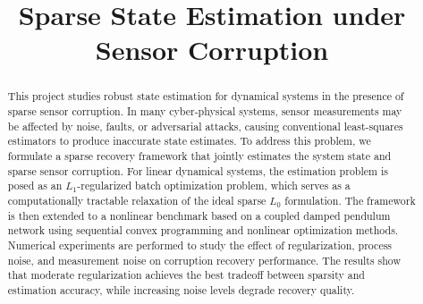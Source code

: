 \documentclass[conference]{IEEEtran}
\begin{document}
\title{Sparse State Estimation under Sensor Corruption \\

}

\author{

\and
{}

}

\maketitle

\begin{abstract}
This project studies robust state estimation for dynamical systems in the presence of sparse sensor corruption. In many cyber-physical systems, sensor measurements may be affected by noise, faults, or adversarial attacks, causing conventional least-squares estimators to produce inaccurate state estimates. To address this problem, we formulate a sparse recovery framework that jointly estimates the system state and sparse sensor corruption. For linear dynamical systems, the estimation problem is posed as an $L_1$-regularized batch optimization problem, which serves as a computationally tractable relaxation of the ideal sparse $L_0$ formulation. The framework is then extended to a nonlinear benchmark based on a coupled damped pendulum network using sequential convex programming and nonlinear optimization methods. Numerical experiments are performed to study the effect of regularization, process noise, and measurement noise on corruption recovery performance. The results show that moderate regularization achieves the best tradeoff between sparsity and estimation accuracy, while increasing noise levels degrade recovery quality. 
\end{abstract}
\end{document}

